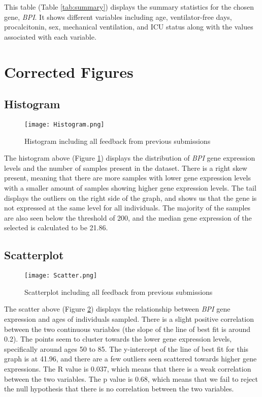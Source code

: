\documentclass{article}
\begin{document}
This table (Table \ref{tab:summary}) displays the summary statistics for the chosen gene, \emph{BPI}. It shows different variables including age, ventilator-free days, procalcitonin, sex, mechanical ventilation, and ICU status along with the values associated with each variable. 

\newpage

\section{Corrected Figures}
\subsection{Histogram}

\begin{figure}[h]
    \centering
    \texttt{[image: Histogram.png]}
    \caption{Histogram including all feedback from previous submissions}
    \label{fig:hist}
\end{figure}

The histogram above (Figure \ref{fig:hist}) displays the distribution of \emph{BPI} gene expression levels and the number of samples present in the dataset. There is a right skew present, meaning that there are more samples with lower gene expression levels with a smaller amount of samples showing higher gene expression levels. The tail displays the outliers on the right side of the graph, and shows us that the gene is not expressed at the same level for all individuals. The majority of the samples are also seen below the threshold of 200, and the median gene expression of the selected is calculated to be 21.86.


\newpage
\subsection{Scatterplot}
\begin{figure}[h]
    \centering
    \texttt{[image: Scatter.png]}
    \caption{Scatterplot including all feedback from previous submissions}
    \label{fig:scatter}
\end{figure}

The scatter above (Figure \ref{fig:scatter}) displays the relationship between \emph{BPI} gene expression and ages of individuals sampled. There is a slight positive correlation between the two continuous variables (the slope of the line of best fit is around 0.2). The points seem to cluster towards the lower gene expression levels, specifically around ages 50 to 85. The y-intercept of the line of best fit for this graph is at 41.96, and there are a few outliers seen scattered towards higher gene expressions. The R value is 0.037, which means that there is a weak correlation between the two variables. The p value is 0.68, which means that we fail to reject the null hypothesis that there is no correlation between the two variables.
\end{document}
